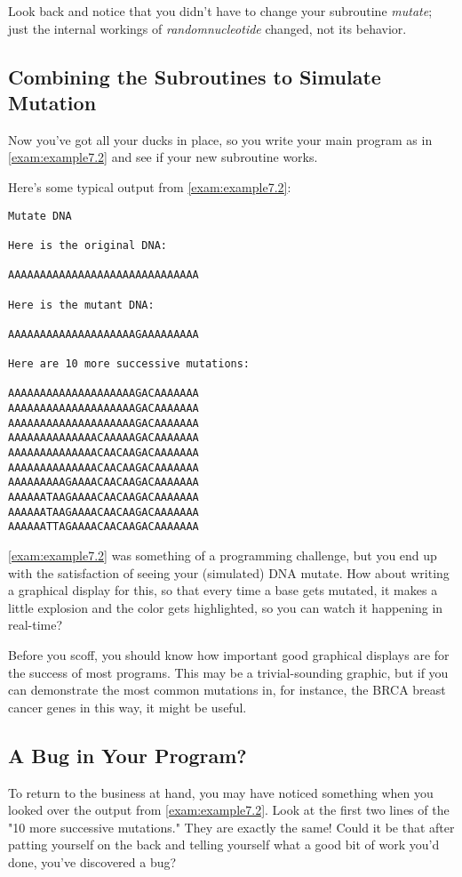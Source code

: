 Look back and notice that you didn't have to change your subroutine \textit{mutate}; just the internal workings of \textit{randomnucleotide} changed, not its behavior. 

\subsection{Combining the Subroutines to Simulate Mutation}
Now you've got all your ducks in place, so you write your main program as in \autoref{exam:example7.2} and see if your new subroutine works.



Here's some typical output from \autoref{exam:example7.2}:

\begin{lstlisting}
Mutate DNA

Here is the original DNA:

AAAAAAAAAAAAAAAAAAAAAAAAAAAAAA

Here is the mutant DNA:

AAAAAAAAAAAAAAAAAAAAGAAAAAAAAA

Here are 10 more successive mutations:

AAAAAAAAAAAAAAAAAAAAGACAAAAAAA
AAAAAAAAAAAAAAAAAAAAGACAAAAAAA
AAAAAAAAAAAAAAAAAAAAGACAAAAAAA
AAAAAAAAAAAAAACAAAAAGACAAAAAAA
AAAAAAAAAAAAAACAACAAGACAAAAAAA
AAAAAAAAAAAAAACAACAAGACAAAAAAA
AAAAAAAAAGAAAACAACAAGACAAAAAAA
AAAAAATAAGAAAACAACAAGACAAAAAAA
AAAAAATAAGAAAACAACAAGACAAAAAAA
AAAAAATTAGAAAACAACAAGACAAAAAAA
\end{lstlisting}

\autoref{exam:example7.2} was something of a programming challenge, but you end up with the satisfaction of seeing your (simulated) DNA mutate. How about writing a graphical display for this, so that every time a base gets mutated, it makes a little explosion and the color gets highlighted, so you can watch it happening in real-time?

Before you scoff, you should know how important good graphical displays are for the success of most programs. This may be a trivial-sounding graphic, but if you can demonstrate the most common mutations in, for instance, the BRCA breast cancer genes in this way, it might be useful. 

\subsection{A Bug in Your Program?}
To return to the business at hand, you may have noticed something when you looked over the output from \autoref{exam:example7.2}. Look at the first two lines of the "10 more successive mutations." They are exactly the same! Could it be that after patting yourself on the back and telling yourself what a good bit of work you'd done, you've discovered a bug?

